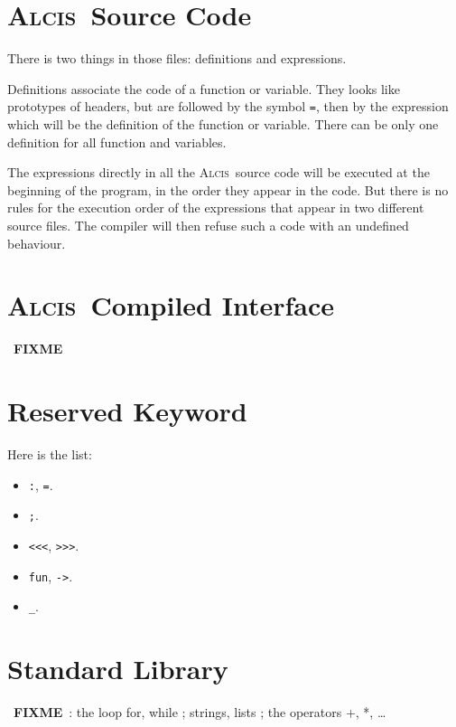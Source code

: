 \documentclass{article}
\newcommand{\Alcis}{\textsc{Alcis}~}
\newcommand{\FIXME}{~\textbf{FIXME}~}
\begin{document}
\section{\Alcis Source Code}

There is two things in those files: definitions and expressions.

Definitions associate the code of a function or variable.
They looks like prototypes of headers, but are followed by the symbol \lstinline$=$, then by the expression which will be the definition of the function or variable.
There can be only one definition for all function and variables.

The expressions directly in all the \Alcis source code will be executed at the beginning of the program, in the order they appear in the code.
But there is no rules for the execution order of the expressions that appear in two different source files.
The compiler will then refuse such a code with an undefined behaviour.

\section{\Alcis Compiled Interface}

\FIXME

\section{Reserved Keyword}

Here is the list:
\begin{itemize}
\item \lstinline$:$, \lstinline$=$.
\item \lstinline$;$.
\item \lstinline$<<<$, \lstinline$>>>$.
\item \lstinline$fun$, \lstinline$->$.
\item \lstinline$_$.
\end{itemize}

\section{Standard Library}

\FIXME: the loop for, while ; strings, lists ; the operators +, *, \ldots
\end{document}
